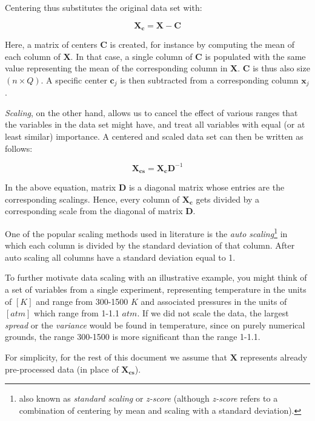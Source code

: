 \documentclass[10pt,twocolumn]{article}
\begin{document}
Centering thus substitutes the original data set with:

\begin{equation}
\bm{X_c} = \bm{X} - \bm{C}
\end{equation}

Here, a matrix of centers $\bm{C}$ is created, for instance by computing the mean of each column of $\bm{X}$. In that case, a single column of $\bm{C}$ is populated with the same value representing the mean of the corresponding column in $\bm{X}$. $\bm{C}$ is thus also size $(n \times Q)$. A specific center $\bm{c}_j$ is then subtracted from a corresponding column $\bm{x}_j$.

\textit{Scaling}, on the other hand, allows us to cancel the effect of various ranges that the variables in the data set might have, and treat all variables with equal (or at least similar) importance. A centered and scaled data set can then be written as follows:

\begin{equation}
\bm{X_{cs}} = \bm{X_c}\bm{D}^{-1}
\end{equation}

In the above equation, matrix $\bm{D}$ is a diagonal matrix whose entries are the corresponding scalings. Hence, every column of $\bm{X_c}$ gets divided by a corresponding scale from the diagonal of matrix $\bm{D}$.

One of the popular scaling methods used in literature is the \textit{auto scaling}\footnote{also known as \textit{standard scaling} or \textit{z-score} (although \textit{z-score} refers to a combination of centering by mean and scaling with a standard deviation).} in which each column is divided by the standard deviation of that column. After auto scaling all columns have a standard deviation equal to 1.

To further motivate data scaling with an illustrative example, you might think of a set of variables from a single experiment, representing temperature in the units of $[K]$ and range from 300-1500 $K$ and associated pressures in the units of $[atm]$ which range from 1-1.1 $atm$. If we did not scale the data, the largest \textit{spread} or the \textit{variance} would be found in temperature, since on purely numerical grounds, the range 300-1500 is more significant than the range 1-1.1.

For simplicity, for the rest of this document we assume that $\bm{X}$ represents already pre-processed data (in place of $\bm{X_{cs}}$).
\end{document}
